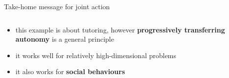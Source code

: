 \documentclass[compress]{beamer}
\begin{document}
\begin{frame}{Take-home message for joint action}
\begin{columns}
        \begin{column}{0.55\linewidth}
            \begin{itemize}
                \item this example is about tutoring, however {\bf progressively
                    transferring autonomy} is a general principle
                \item it works well for relatively high-dimensional problems
                \item it also works for {\bf social behaviours}
            \end{itemize}
        \end{column}
    \end{columns}


\end{frame}
%
%
%
%
%
%
%
%        
%
\end{document}
